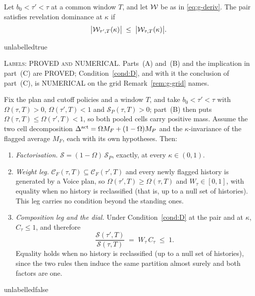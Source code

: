 \begin{condition}
\label{cond:D}
Let $b_0 < \tau' < \tau$ at a common window $T$, and let $\mathcal{W}$ be as in \eqref{eq:g-deriv}. The
pair satisfies revelation dominance at $\kappa$ if
\begin{equation}
\label{eq:g-D}
\bigl|\mathcal{W}_{\tau',T}(\kappa)\bigr| \;\le\; \bigl|\mathcal{W}_{\tau,T}(\kappa)\bigr| .
\end{equation}
\end{condition}

\csname unlabelledtrue\endcsname
\par\noindent\textsc{Labels: PROVED and NUMERICAL.} Parts~(A) and~(B) and the implication in
part~(C) are PROVED; Condition~\ref{cond:D}, and with it the conclusion of part~(C), is NUMERICAL
on the grid Remark~\ref{rem:g-grid} names.\par\nopagebreak
\begin{theorem}
\label{thm:g-threshold}
Fix the plan and cutoff policies and a window $T$, and take $b_0 < \tau' < \tau$ with
$\Omega(\tau,T) > 0$, $\Omega(\tau',T) < 1$ and $\mathcal S_P(\tau,T) > 0$; part~(B) then puts
$\Omega(\tau,T) \le \Omega(\tau',T) < 1$, so both pooled cells carry positive mass. Assume the
two cell decomposition $\Delta^{\mathrm{act}} = \Omega M_F + (1-\Omega)M_P$ and the $\kappa$-invariance of the
flagged average $M_F$, each with its own hypotheses. Then:
\begin{enumerate}[label=(\Alph*),leftmargin=2.4em,itemsep=3pt]
\item \emph{Factorisation.} $\mathcal S = (1-\Omega)\,\mathcal S_P$, exactly, at every
  $\kappa \in (0,1)$.
\item \emph{Weight leg.} $\mathcal C_F(\tau,T) \subseteq \mathcal C_F(\tau',T)$ and every newly
  flagged history is generated by a Voice plan, so $\Omega(\tau',T)\ge\Omega(\tau,T)$ and
  $W_\tau \in [0,1]$, with equality when no history is reclassified (that is, up to a null set
  of histories). This leg carries no condition beyond the standing ones.
\item \emph{Composition leg and the dial.} Under Condition~\ref{cond:D} at the pair and at
  $\kappa$, $C_\tau \le 1$, and therefore
  \begin{equation}
  \label{eq:g-dial}
  \frac{\mathcal S(\tau',T)}{\mathcal S(\tau,T)} \;=\; W_\tau\,C_\tau \;\le\; 1 .
  \end{equation}
  Equality holds when no history is reclassified (up to a null set of histories), since the two
  rules then induce the same partition almost surely and both factors are one.
\end{enumerate}
\end{theorem}
\csname unlabelledfalse\endcsname

